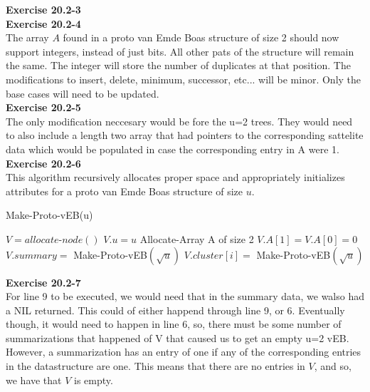\documentclass{article}
\begin{document}
\noindent\textbf{Exercise 20.2-3}\\



\noindent\textbf{Exercise 20.2-4}\\

The array $A$ found in a proto van Emde Boas structure of size 2 should now support integers, instead of just bits.  All other pats of the structure will remain the same.  The integer will store the number of duplicates at that position.  The modifications to insert, delete, minimum, successor, etc... will be minor.  Only the base cases will need to be updated. \\

\noindent\textbf{Exercise 20.2-5}\\

The only modification neccesary would be fore the u=2 trees. They would need to also include a length two array that had pointers to the corresponding sattelite data which would be populated in case the corresponding entry in A were 1.\\

\noindent\textbf{Exercise 20.2-6}\\

This algorithm recursively allocates proper space and appropriately initializes attributes for a proto van Emde Boas structure of size $u$. \\
\begin{algorithm}
\caption{Make-Proto-vEB(u)}
\begin{algorithmic}
\State $V = allocate$-$node()$
\State $V.u = u$
	\State Allocate-Array A of size 2
	\State $V.A[1] = V.A[0] = 0$
\Else
	\State $V.summary =$ Make-Proto-vEB$(\sqrt{u})$
		\State $V.cluster[i] = $ Make-Proto-vEB$(\sqrt{u})$
	\EndFor
\EndIf
\end{algorithmic}
\end{algorithm}

\noindent\textbf{Exercise 20.2-7}\\

For line 9 to be executed, we would need that in the summary data, we walso had a NIL returned. This could of either happend through line 9, or 6. Eventually though, it would need to happen in line 6, so, there must be some number of summarizations that happened of V that caused us to get an empty u=2 vEB. However, a summarization has an entry of one if any of the corresponding entries in the datastructure are one. This means that there are no entries in $V$, and so, we have that $V$ is empty.\\
\end{document}
